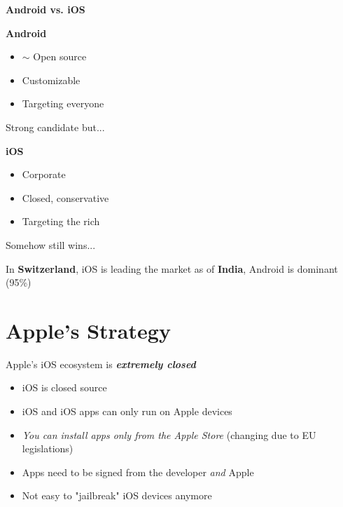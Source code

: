 \documentclass[11pt]{article}
\begin{document}
\vspace{0.5cm}

\begin{center}
  {\LARGE \textbf{Android vs. iOS}}
\end{center}
\vspace{0.5cm}

\begin{minipage}{0.45\textwidth}
\textbf{Android} \\
\begin{itemize}
	\item $\sim$ Open source \\
	\item Customizable \\ 
	\item Targeting everyone \\
\end{itemize}
Strong candidate but...

\end{minipage}
\hfill
\begin{minipage}{0.45\textwidth}
\textbf{iOS} \\
\begin{itemize}
	\item Corporate \\
	\item Closed, conservative \\
	\item Targeting the rich \\
\end{itemize}
Somehow still wins...
\end{minipage}

In \textbf{Switzerland}, iOS is leading the market as of \textbf{India}, Android is dominant (95\%)

\section*{Apple's Strategy}

Apple's iOS ecosystem is \textbf{\textit{extremely closed}}
\begin{itemize}
	\item iOS is closed source
	\item iOS and iOS apps can only run on Apple devices
	\item \textit{You can install apps only from the Apple Store} (changing due to EU legislations)
	\item Apps need to be signed from the developer \textit{and} Apple
	\item Not easy to "jailbreak" iOS devices anymore
\end{itemize}
\end{document}
